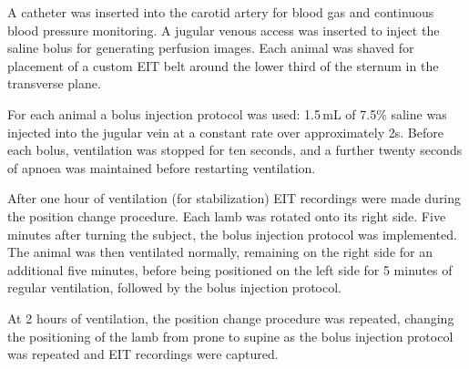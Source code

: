A catheter was inserted into the carotid artery for blood gas and 
continuous blood pressure monitoring. A jugular venous access was inserted 
to inject the saline bolus for generating perfusion images. Each 
animal was shaved for placement of a custom EIT belt 
around the lower third of the sternum in the transverse plane.

For each animal a bolus injection protocol was used: 
1.5\,mL of 7.5\% saline was injected into the jugular vein
at a constant rate over approximately 2s.
Before each bolus, ventilation was stopped for ten seconds,
and a further twenty seconds of apnoea was maintained before
restarting ventilation.

After one hour of ventilation (for stabilization) EIT recordings were made 
during the position change procedure. Each lamb was rotated
onto its right side. Five minutes after turning
the subject, the bolus injection protocol was implemented.
The animal was then ventilated normally, remaining on the right side for 
an additional five minutes, before being positioned on the left side 
for 5 minutes of regular ventilation, followed by the bolus
injection protocol.

At 2 hours of ventilation, the position change procedure was repeated,
changing the positioning of the lamb from prone to supine as the bolus 
injection protocol was repeated and EIT recordings were captured.


